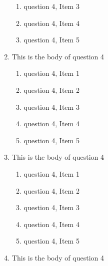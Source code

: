 \documentclass{article}
\begin{document}
\begin{enumerate}
\begin{enumerate}
    \item
    question 4, Item 3

    \item
    question 4, Item 4

    \item
    question 4, Item 5

  \end{enumerate}

\item
This is the body of question 4

  \begin{enumerate}

    \item
    question 4, Item 1

    \item
    question 4, Item 2

    \item
    question 4, Item 3

    \item
    question 4, Item 4

    \item
    question 4, Item 5

  \end{enumerate}

\item
This is the body of question 4

  \begin{enumerate}

    \item
    question 4, Item 1

    \item
    question 4, Item 2

    \item
    question 4, Item 3

    \item
    question 4, Item 4

    \item
    question 4, Item 5

  \end{enumerate}

\item
This is the body of question 4


\end{enumerate}
\end{document}

